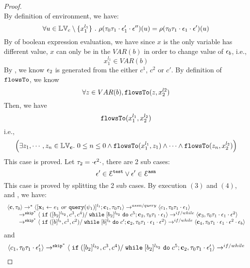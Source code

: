 \begin{proof}
\[ \]
 By definition of environment, we have:
\[
  \forall u \in \mathbb{LV}_c \setminus \{x_1^{l_1}\} ~.~
  \rho(\mathtt{\tau}_0 \mathtt{\tau}_1 \cdot \mathtt{\epsilon}_1' \cdot \mathtt{\epsilon}'') (u) =  
  \rho(\mathtt{\tau}_0 \mathtt{\tau}_1 \cdot \mathtt{\epsilon}_1 \cdot \mathtt{\epsilon}') (u)
\]
%
By  of boolean expression evaluation, we have since $x$ is the only variable has different value, $x$ can only be in the $VAR(b)$ in order to change value of $\mathtt{\epsilon}_b$, i.e.,
 \[
  x_1^{l_1} \in VAR(b)
 \]
 By , we know $\mathtt{\epsilon}_2$ is generated from the either $c^1$, $c^2$ or $c'$.
 By definition of $\mathtt{flowsTo}$, we know
 \[
 \forall z \in VAR(b), \mathtt{flowsTo}(z, x_2^{l2})
 \]
 Then, we have
 \[
 \mathtt{flowsTo}(x_1^{l_1}, x_2^{l_2})
 \]
 i.e.,
 \[
 \Big( \exists z_1, \cdots, z_n \in \mathbb{LV}_{{\boldsymbol{\mathbf{c}}}}. ~ 0 \leq n \leq 0 \land
  \mathtt{flowsTo}(x_1^{l_1}, z_1) 
  \land \cdots \land \mathtt{flowsTo}(z_n, x_2^{l_2}) \Big)
 \]
 This case is proved.
%
 Let $\mathtt{\tau}_2 = \cdot \mathtt{\epsilon}^2 \cdot$, there are 2 sub cases: 
 \[
 \mathtt{\epsilon}' \in \mathcal{E}^{\mathtt{{test}}} \lor \mathtt{\epsilon}' \in \mathcal{E}^{\mathtt{{asn}}}
 \]
 This case is proved by splitting the 2 sub cases.
 \subcaseL{$\event^2 \in \eventset^{\test}$}
By execution $(3)$ and $(4)$, and , we have:
\[
  \begin{array}{l}   
  \langle {\boldsymbol{\mathbf{c}}}, \mathtt{\tau}_0 \rangle 
  \rightarrow^{*} 
  \langle [\mathrel{ {\boldsymbol{\mathbf{x}}}_1 \leftarrow e_1~ or ~ {\tt query}(\psi_1) }]^{l_1} ; {\boldsymbol{\mathbf{c}}}_1, \mathtt{\tau}_0 \mathtt{\tau}_1 \rangle  \rightarrow^{assn/query}
 \langle c_1, \mathtt{\tau}_0 \mathtt{\tau}_1 \cdot \mathtt{\epsilon}_1 \rangle 
  \\ 
  \qquad \rightarrow^{\mathtt{skip}^*} 
  \langle \;\mathtt{if}\;([b_2]{}^{l_{b_2}}, c^3, c^4) / \;\mathtt{while}\; [b_2]{}^{l_{b_2}} \;\mathtt{do}\; c^5; {\boldsymbol{\mathbf{c}}}_2, 
  \mathtt{\tau}_0 \mathtt{\tau}_1 \cdot \mathtt{\epsilon}_1 \rangle 
  \rightarrow^{if / while} 
  \langle {\boldsymbol{\mathbf{c}}}_3,  \mathtt{\tau}_0 \mathtt{\tau}_1 \cdot \mathtt{\epsilon}_1 \cdot \mathtt{\epsilon}^2 \rangle 
  \\ 
  \qquad \rightarrow^{\mathtt{skip}^*} 
  \langle \;\mathtt{if}\;([b]{}^{l_b}, c^1, c^2) / \;\mathtt{while}\; [b]{}^{l_b} \;\mathtt{do}\; c'; {\boldsymbol{\mathbf{c}}}_2, 
  \mathtt{\tau}_0 \mathtt{\tau}_1 \cdot \mathtt{\epsilon}_1\cdot \mathtt{\epsilon}^2 \rangle 
  \rightarrow^{if / while} 
  \langle {\boldsymbol{\mathbf{c}}}_4,  \mathtt{\tau}_0 \mathtt{\tau}_1 \cdot \mathtt{\epsilon}_1 \cdot \mathtt{\epsilon}^2 \cdot \mathtt{\epsilon}_b \rangle 
\end{array}
 \]
and 
 \[
  \begin{array}{l}   
  \langle c_1, \mathtt{\tau}_0 \mathtt{\tau}_1 \cdot \mathtt{\epsilon}_1' \rangle 
 \rightarrow^{\mathtt{skip}^*} 
  \langle \;\mathtt{if}\;([b_2]{}^{l_{b_2}}, c^3, c^4) / \;\mathtt{while}\; [b_2]{}^{l_{b_2}} \;\mathtt{do}\; c^5; {\boldsymbol{\mathbf{c}}}_2, 
  \mathtt{\tau}_0 \mathtt{\tau}_1 \cdot \mathtt{\epsilon}_1' \rangle 
  \rightarrow^{if / while} 

\end{array}\]
\end{proof}
